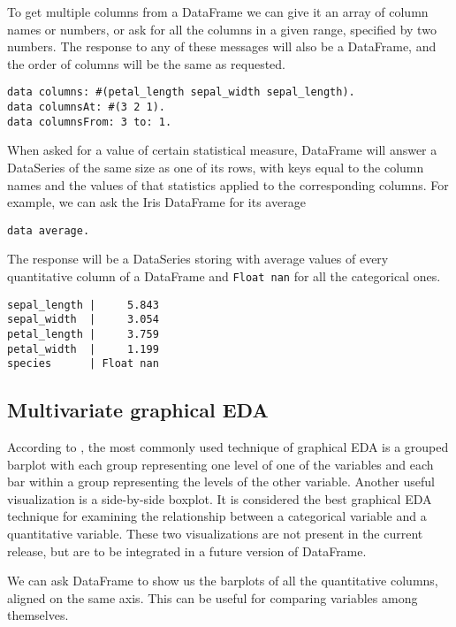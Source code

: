 \documentclass[sigplan]{acmart}
\begin{document}
To get multiple columns from a DataFrame we can give it an array of column names or numbers, or ask for all the columns in a given range, specified by two numbers. The response to any of these messages will also be a DataFrame, and the order of columns will be the same as requested.

\begin{lstlisting}[basicstyle=\small,language=Smalltalk]
data columns: #(petal_length sepal_width sepal_length).
data columnsAt: #(3 2 1).
data columnsFrom: 3 to: 1.
\end{lstlisting}

When asked for a value of certain statistical measure, DataFrame will answer a DataSeries of the same size as one of its rows, with keys equal to the column names and the values of that statistics applied to the corresponding columns. For example, we can ask the Iris DataFrame for its average

\begin{lstlisting}[basicstyle=\small,language=Smalltalk]
data average.
\end{lstlisting}

The response will be a DataSeries storing with average values of every quantitative column of a DataFrame and \texttt{Float nan} for all the categorical ones.

\begin{lstlisting}[basicstyle=\small]
sepal_length |     5.843
sepal_width  |     3.054
petal_length |     3.759
petal_width  |     1.199
species      | Float nan
\end{lstlisting}

\subsection{Multivariate graphical EDA}
\label{sec:multi-graph}

According to \cite{Seltman}, the most commonly used technique of graphical EDA is a grouped barplot with each group representing one level of one of the variables and each bar within a group representing the levels of the other variable. Another useful visualization is a side-by-side boxplot. It is considered the best graphical EDA technique for examining the relationship between a categorical variable and a quantitative variable. These two visualizations are not present in the current release, but are to be integrated in a future version of DataFrame.

We can ask DataFrame to show us the barplots of all the quantitative columns, aligned on the same axis. This can be useful for comparing variables among themselves.
\end{document}
